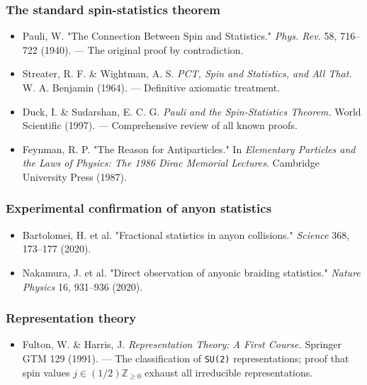 \documentclass[aps,prd,preprint,superscriptaddress,longbibliography,floatfix]{revtex4-2}
\theoremstyle{remark}
\begin{document}
\subsubsection{The standard spin-statistics theorem}


\begin{itemize}
  \item Pauli, W. "The Connection Between Spin and Statistics." \textit{Phys. Rev.} 58, 716--722 (1940). --- The original proof by contradiction.
  \item Streater, R. F. \& Wightman, A. S. \textit{PCT, Spin and Statistics, and All That.} W. A. Benjamin (1964). --- Definitive axiomatic treatment.
  \item Duck, I. \& Sudarshan, E. C. G. \textit{Pauli and the Spin-Statistics Theorem.} World Scientific (1997). --- Comprehensive review of all known proofs.
  \item Feynman, R. P. "The Reason for Antiparticles." In \textit{Elementary Particles and the Laws of Physics: The 1986 Dirac Memorial Lectures}. Cambridge University Press (1987).
\end{itemize}


\subsubsection{Experimental confirmation of anyon statistics}


\begin{itemize}
  \item Bartolomei, H. et al. "Fractional statistics in anyon collisions." \textit{Science} 368, 173--177 (2020).
  \item Nakamura, J. et al. "Direct observation of anyonic braiding statistics." \textit{Nature Physics} 16, 931--936 (2020).
\end{itemize}


\subsubsection{Representation theory}


\begin{itemize}
  \item Fulton, W. \& Harris, J. \textit{Representation Theory: A First Course.} Springer GTM 129 (1991). --- The classification of \texttt{SU(2)} representations; proof that spin values $j \in (1/2)\mathbb{Z}_{\geq0}$ exhaust all irreducible representations.
\end{itemize}
\end{document}
